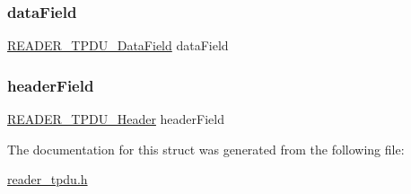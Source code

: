 \subsubsection{\texorpdfstring{data\+Field}{dataField}}
{\footnotesize\ttfamily \hyperlink{struct_r_e_a_d_e_r___t_p_d_u___data_field}{R\+E\+A\+D\+E\+R\+\_\+\+T\+P\+D\+U\+\_\+\+Data\+Field} data\+Field}

\mbox{\label{struct_r_e_a_d_e_r___t_p_d_u___command_a03160376b918660c9a47dfc9eeb440f7}} 
\subsubsection{\texorpdfstring{header\+Field}{headerField}}
{\footnotesize\ttfamily \hyperlink{struct_r_e_a_d_e_r___t_p_d_u___header}{R\+E\+A\+D\+E\+R\+\_\+\+T\+P\+D\+U\+\_\+\+Header} header\+Field}



The documentation for this struct was generated from the following file\+:\begin{DoxyCompactItemize}
\item 
\hyperlink{reader__tpdu_8h}{reader\+\_\+tpdu.\+h}\end{DoxyCompactItemize}
